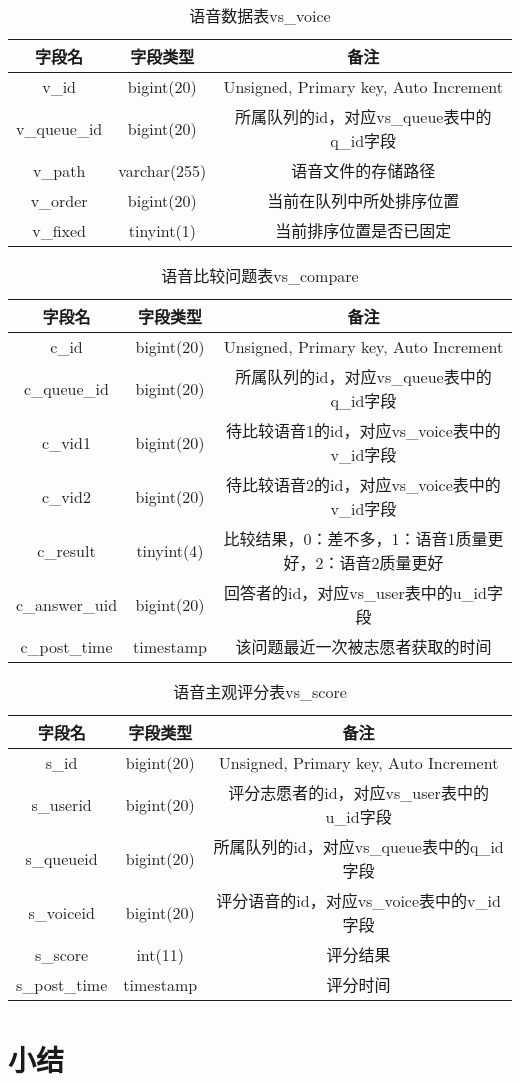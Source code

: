 \begin{table}
\centering
\caption{语音数据表vs\_voice}
\label{tab:voice}
\begin{tabular}{ccc}
\toprule[1.5pt]
字段名 & 字段类型 & 备注 \\ \midrule[1pt]
v\_id & bigint(20) & Unsigned, Primary key, Auto Increment \\
v\_queue\_id & bigint(20) & 所属队列的id，对应vs\_queue表中的q\_id字段 \\
v\_path & varchar(255) & 语音文件的存储路径 \\
v\_order & bigint(20) & 当前在队列中所处排序位置 \\
v\_fixed & tinyint(1) & 当前排序位置是否已固定 \\
\end{tabular}
\end{table}

\begin{table}
\centering
\caption{语音比较问题表vs\_compare}
\label{tab:compare}
\begin{tabular}{ccc}
\toprule[1.5pt]
字段名 & 字段类型 & 备注 \\ \midrule[1pt]
c\_id & bigint(20) & Unsigned, Primary key, Auto Increment \\
c\_queue\_id & bigint(20) & 所属队列的id，对应vs\_queue表中的q\_id字段 \\
c\_vid1 & bigint(20) & 待比较语音1的id，对应vs\_voice表中的v\_id字段 \\
c\_vid2 & bigint(20) & 待比较语音2的id，对应vs\_voice表中的v\_id字段 \\
c\_result & tinyint(4) & 比较结果，0：差不多，1：语音1质量更好，2：语音2质量更好 \\
c\_answer\_uid & bigint(20) & 回答者的id，对应vs\_user表中的u\_id字段 \\
c\_post\_time & timestamp & 该问题最近一次被志愿者获取的时间 \\ \bottomrule[1.5pt]
\end{tabular}
\end{table}

\begin{table}
\centering
\caption{语音主观评分表vs\_score}
\label{tab:score}
\begin{tabular}{ccc}
\toprule[1.5pt]
字段名 & 字段类型 & 备注 \\ \midrule[1pt]
s\_id & bigint(20) & Unsigned, Primary key, Auto Increment \\
s\_userid & bigint(20) & 评分志愿者的id，对应vs\_user表中的u\_id字段 \\
s\_queueid & bigint(20) & 所属队列的id，对应vs\_queue表中的q\_id字段 \\
s\_voiceid & bigint(20) & 评分语音的id，对应vs\_voice表中的v\_id字段 \\
s\_score & int(11) & 评分结果 \\
s\_post\_time & timestamp & 评分时间 \\ \bottomrule[1.5pt]
\end{tabular}
\end{table}

\section{小结}

